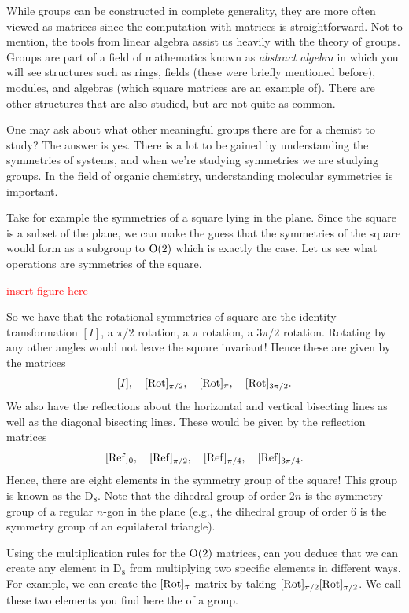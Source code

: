             While groups can be constructed in complete generality, they are more often viewed as matrices since the computation with matrices is straightforward. Not to mention, the tools from linear algebra assist us heavily with the theory of groups.  Groups are part of a field of mathematics known as \emph{abstract algebra} in which you will see structures such as rings, fields (these were briefly mentioned before), modules, and algebras (which square matrices are an example of). There are other structures that are also studied, but are not quite as common.  
            
            One may ask about what other meaningful groups there are for a chemist to study? The answer is yes.  There is a lot to be gained by understanding the symmetries of systems, and when we're studying symmetries we are studying groups. In the field of organic chemistry, understanding molecular symmetries is important.  
            
            Take for example the symmetries of a square lying in the plane. Since the square is a subset of the plane, we can make the guess that the symmetries of the square would form as a subgroup to $\mathrm{O}(2)$ which is exactly the case. Let us see what operations are symmetries of the square.
            
            \textcolor{red}{insert figure here}
            
            So we have that the rotational symmetries of square are the identity transformation $[I]$, a $\pi/2$ rotation, a $\pi$ rotation, a $3\pi/2$ rotation. Rotating by any other angles would not leave the square invariant! Hence these are given by the matrices
            \[
            [I],\quad [\mathrm{Rot}]_{\pi/2},\quad [\mathrm{Rot}]_{\pi}, \quad [\mathrm{Rot}]_{3\pi/2}.
            \]
            We also have the reflections about the horizontal and vertical bisecting lines as well as the diagonal bisecting lines.  These would be given by the reflection matrices
            \[
            [\mathrm{Ref}]_{0},\quad [\mathrm{Ref}]_{\pi/2}, \quad [\mathrm{Ref}]_{\pi/4}, \quad [\mathrm{Ref}]_{3\pi/4}.
            \]
            Hence, there are eight elements in the symmetry group of the square! This group is known as the  $\mathrm{D}_8$. Note that the dihedral group of order $2n$ is the symmetry group of a regular $n$-gon in the plane (e.g., the dihedral group of order 6 is the symmetry group of an equilateral triangle).
            
            \begin{exercise}
            Using the multiplication rules for the $\mathrm{O}(2)$ matrices, can you deduce that we can create any element in $\mathrm{D}_8$ from multiplying two specific elements in different ways. For example, we can create the $[\mathrm{Rot}]_\pi$ matrix by taking $[\mathrm{Rot}]_{\pi/2}[\mathrm{Rot}]_{\pi/2}$. We call these two elements you find here the   of a group.
            \end{exercise}
            
